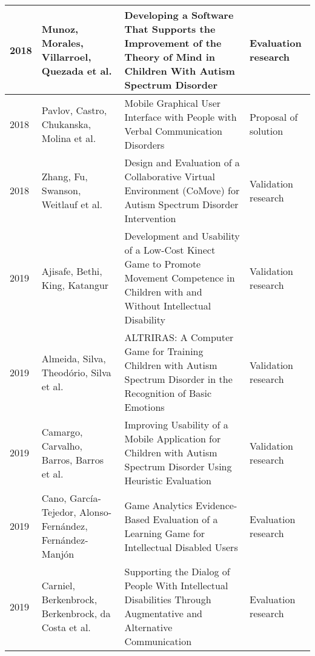\documentclass[utf8,english]{gradu3}
\begin{document}
\begin{longtable}{|>{\scriptsize}l|>{\scriptsize}p{3cm}|>{\scriptsize}p{8cm}|>{\scriptsize}p{2.4cm}|}
  2018          & Munoz, Morales, Villarroel, Quezada et al.                           & Developing a Software That Supports the Improvement of the Theory of Mind in Children With Autism Spectrum Disorder                                                                          & Evaluation research        \\ \hline
  2018          & Pavlov, Castro, Chukanska, Molina et al.                             & Mobile Graphical User Interface with People with Verbal Communication Disorders                                                                                                              & Proposal of solution       \\ \hline
  2018          & Zhang, Fu, Swanson, Weitlauf et al.                                  & Design and Evaluation of a Collaborative Virtual Environment (CoMove) for Autism Spectrum Disorder Intervention                                                                              & Validation research        \\ \hline
  2019          & Ajisafe, Bethi, King, Katangur                                       & Development and Usability of a Low-Cost Kinect Game to Promote Movement Competence in Children with and Without Intellectual Disability                                                      & Validation research        \\ \hline
  2019          & Almeida, Silva, Theodório, Silva et al.                              & ALTRIRAS: A Computer Game for Training Children with Autism Spectrum Disorder in the Recognition of Basic Emotions                                                                           & Validation research        \\ \hline
  2019          & Camargo, Carvalho, Barros, Barros et al.                             & Improving Usability of a Mobile Application for Children with Autism Spectrum Disorder Using Heuristic Evaluation                                                                            & Validation research        \\ \hline
  2019          & Cano, García-Tejedor, Alonso-Fernández, Fernández-Manjón             & Game Analytics Evidence-Based Evaluation of a Learning Game for Intellectual Disabled Users                                                                                                  & Evaluation research        \\ \hline
  2019          & Carniel, Berkenbrock, Berkenbrock, da Costa et al.                   & Supporting the Dialog of People With Intellectual Disabilities Through Augmentative and Alternative Communication                                                                            & Evaluation research        \\ \hline

\end{longtable}
\end{document}
